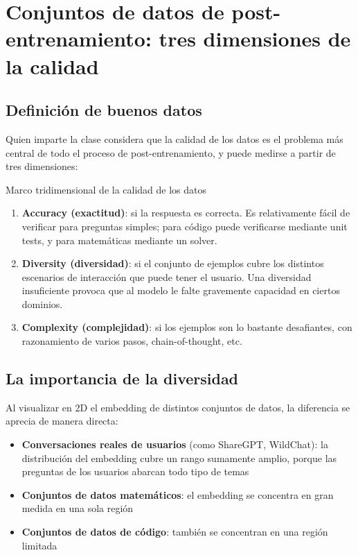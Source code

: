 \documentclass[a4paper]{article}
\begin{document}
\newpage
\section{Conjuntos de datos de post-entrenamiento: tres dimensiones de la calidad}

\subsection{Definición de buenos datos}

Quien imparte la clase considera que la calidad de los datos es el problema más central de todo el proceso de post-entrenamiento, y puede medirse a partir de tres dimensiones:

\begin{importantbox}{Marco tridimensional de la calidad de los datos}
\begin{enumerate}
    \item \textbf{Accuracy (exactitud)}: si la respuesta es correcta. Es relativamente fácil de verificar para preguntas simples; para código puede verificarse mediante unit tests, y para matemáticas mediante un solver.
    \item \textbf{Diversity (diversidad)}: si el conjunto de ejemplos cubre los distintos escenarios de interacción que puede tener el usuario. Una diversidad insuficiente provoca que al modelo le falte gravemente capacidad en ciertos dominios.
    \item \textbf{Complexity (complejidad)}: si los ejemplos son lo bastante desafiantes, con razonamiento de varios pasos, chain-of-thought, etc.
\end{enumerate}
\end{importantbox}

\subsection{La importancia de la diversidad}

Al visualizar en 2D el embedding de distintos conjuntos de datos, la diferencia se aprecia de manera directa:

\begin{itemize}
    \item \textbf{Conversaciones reales de usuarios} (como ShareGPT, WildChat): la distribución del embedding cubre un rango sumamente amplio, porque las preguntas de los usuarios abarcan todo tipo de temas
    \item \textbf{Conjuntos de datos matemáticos}: el embedding se concentra en gran medida en una sola región
    \item \textbf{Conjuntos de datos de código}: también se concentran en una región limitada
\end{itemize}
\end{document}
